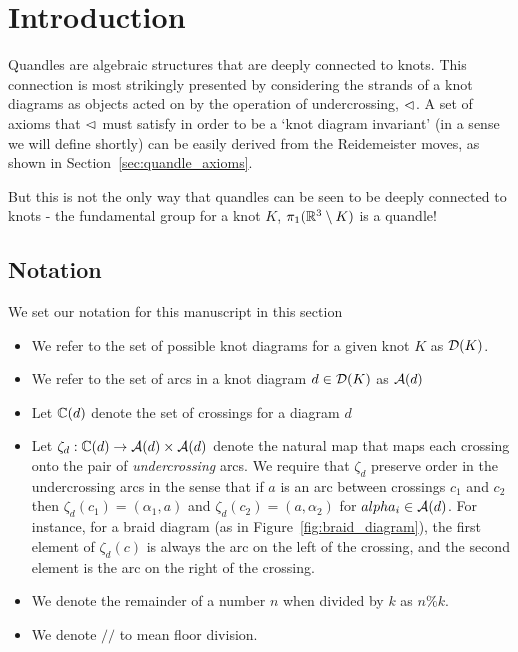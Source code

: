 \documentclass[paper.tex]{subfiles}
\begin{document}
\section{Introduction}
\label{sec:intro}

Quandles are algebraic structures that are deeply connected to knots. This connection is most strikingly presented by considering the strands of a knot diagrams as objects acted on by the operation of
undercrossing, $\vartriangleleft$. A set of axioms that $\vartriangleleft$ must satisfy in order to be a `knot diagram invariant' (in a sense we will define shortly) can be easily derived from the Reidemeister moves, as shown in
Section~\ref{sec:quandle_axioms}.

But this is not the only way that quandles can be seen to be deeply connected to knots - the fundamental group for a knot $K$, $\pi_1(\mathbb{R}^3 \setminus K)$ is a quandle!

\subsection{Notation}

We set our notation for this manuscript in this section

\begin{itemize}
  \item We refer to the set of possible knot diagrams for a given knot $K$ as $\operatorname{\mathcal{D}}(K)$.
  \item We refer to the set of arcs in a knot diagram $d \in \operatorname{\mathcal{D}}(K)$ as $\mathcal{A}(d)$
  \item Let $\mathbb{C}(d)$ denote the set of crossings for a diagram $d$
  \item Let $\zeta_d: \mathbb{C}(d) \to \mathcal{A}(d) \times \mathcal{A}(d)$ denote the natural map that maps each crossing onto the pair of
    \emph{undercrossing} arcs. We require that $\zeta_d$ preserve order in the undercrossing arcs in the
    sense that if $a$ is an arc between crossings $c_1$ and $c_2$ then $\zeta_d(c_1) = (\alpha_1, a)$ and $\zeta_d(c_2) = (a, \alpha_2)$ for
    $alpha_i \in \mathcal{A}(d)$. For instance, for a braid diagram (as in Figure~\ref{fig:braid_diagram}), the first element of $\zeta_d(c)$ is always the arc on the left of the crossing,
    and the second element is the arc on the right of the crossing.
  \item We denote the remainder of a number $n$ when divided by $k$ as $n\%k$.
  \item We denote $//$ to mean floor division.
\end{itemize}
\end{document}
